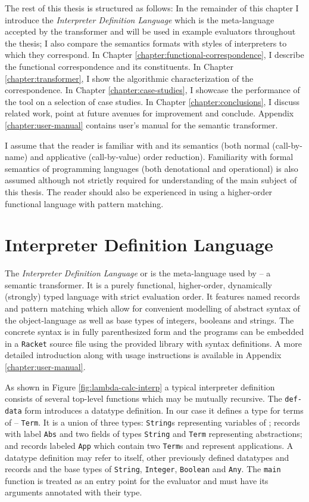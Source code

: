 The rest of this thesis is structured as follows:
In the remainder of this chapter I introduce the \textit{Interpreter Definition Language} which is the meta-language accepted by the transformer and will be used in example evaluators throughout the thesis; I also compare the semantics formats with styles of interpreters to which they correspond.
In Chapter \ref{chapter:functional-correspondence}, I describe the functional correspondence and its constituents.
In Chapter \ref{chapter:transformer}, I show the algorithmic characterization of the correspondence.
In Chapter \ref{chapter:case-studies}, I showcase the performance of the tool on a selection of case studies.
In Chapter \ref{chapter:conclusions}, I discuss related work, point at future avenues for improvement and conclude. %
Appendix \ref{chapter:user-manual} contains user's manual for the semantic transformer.

I assume that the reader is familiar with \LC{} and its semantics (both normal (call-by-name) and applicative (call-by-value) order reduction).
Familiarity with formal semantics of programming languages (both denotational and operational) is also assumed although not strictly required for understanding of the main subject of this thesis.
The reader should also be experienced in using a higher-order functional language with pattern matching.

\section{Interpreter Definition Language}\label{sec:idl}
The \emph{Interpreter Definition Language} or \IDL{} is the meta-language used by \semt{} -- a semantic transformer.
It is a purely functional, higher-order, dynamically (strongly) typed language with strict evaluation order.
It features named records and pattern matching which allow for convenient modelling of abstract syntax of the object-language as well as base types of integers, booleans and strings.
The concrete syntax is in fully parenthesized form and the programs can be embedded in a \texttt{Racket} source file using the provided library with syntax definitions.
A more detailed introduction along with usage instructions is available in 
Appendix \ref{chapter:user-manual}.

As shown in Figure \ref{fig:lambda-calc-interp} a typical interpreter definition consists of several top-level functions which may be mutually recursive.
The \lstinline!def-data! form introduces a datatype definition.
In our case it defines a type for terms of \LC{} -- \lstinline!Term!.
It is a union of three types: \lstinline!String!s representing variables of \LC{}; records with label \lstinline!Abs! and two fields of types \lstinline!String! and \lstinline!Term! representing abstractions; and records labeled \lstinline!App! which contain two \lstinline!Term!s and represent applications.
A datatype definition may refer to itself, other previously defined datatypes and records and the base types of \lstinline!String!, \lstinline!Integer!, \lstinline!Boolean! and \lstinline!Any!.
The \texttt{main} function is treated as an entry point for the evaluator and must have its arguments annotated with their type.

